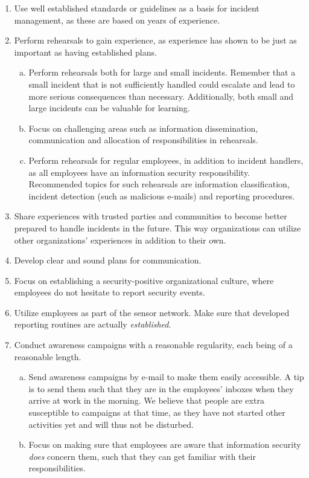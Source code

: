 \begin{enumerate}
\item Use well established standards or guidelines as a basis for incident management, as these are based on years of experience. 
\item Perform rehearsals to gain experience, as experience has shown to be just as important as having established plans.
\begin{enumerate}[a)]
\item Perform rehearsals both for large and small incidents. Remember that a small incident that is not sufficiently handled could escalate and lead to more serious consequences than necessary. Additionally, both small and large incidents can be valuable for learning.
\item Focus on challenging areas such as information dissemination, communication and allocation of responsibilities in rehearsals.
\item Perform rehearsals for regular employees, in addition to incident handlers, as all employees have an information security responsibility. Recommended topics for such rehearsals are information classification, incident detection (such as malicious e-mails) and reporting procedures. 
\end{enumerate}
\item Share experiences with trusted parties and communities to become better prepared to handle incidents in the future. This way organizations can utilize other organizations' experiences in addition to their own.
\item Develop clear and sound plans for communication.
\item Focus on establishing a security-positive organizational culture, where employees do not hesitate to report security events.
\item Utilize employees as part of the sensor network. Make sure that developed reporting routines are actually \textit{established}.
\item Conduct awareness campaigns with a reasonable regularity, each being of a reasonable length.
\begin{enumerate}[a)]
\item Send awareness campaigns by e-mail to make them easily accessible. A tip is to send them such that they are in the employees' inboxes when they arrive at work in the morning. We believe that people are extra susceptible to campaigns at that time, as they have not started other activities yet and will thus not be disturbed.
\item Focus on making sure that employees are aware that information security \textit{does} concern them, such that they can get familiar with their responsibilities.

\end{enumerate}
\end{enumerate}
